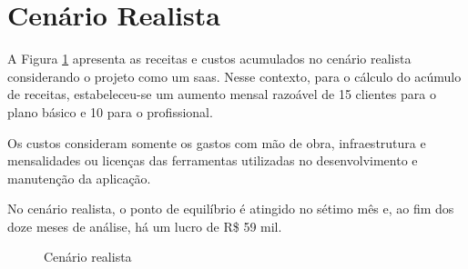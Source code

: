 \section{Cenário Realista}

A Figura \ref{fig:cenario-realista} apresenta as receitas e custos acumulados no cenário realista considerando o projeto como um \gls{saas}. Nesse contexto, para o cálculo do acúmulo de receitas, estabeleceu-se um aumento mensal razoável de 15 clientes para o plano básico e 10 para o profissional.

Os custos consideram somente os gastos com mão de obra, infraestrutura e mensalidades ou licenças das ferramentas utilizadas no desenvolvimento e manutenção da aplicação.

No cenário realista, o ponto de equilíbrio é atingido no sétimo mês e, ao fim dos doze meses de análise, há um lucro de R\$ 59 mil.

\begin{figure}[h]
	\centering
	\caption{Cenário realista}
	\label{fig:cenario-realista}
\end{figure}